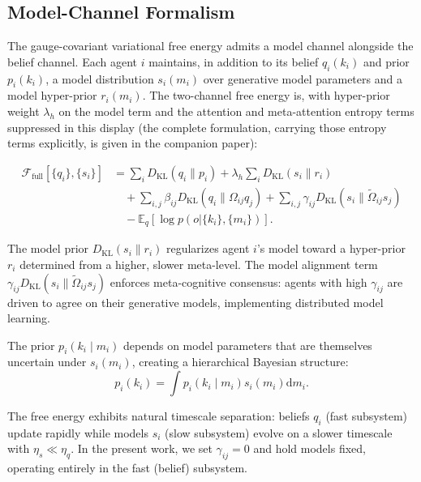 \documentclass[twoside,11pt]{article}
\begin{document}
\subsection{Model-Channel Formalism}
\label{app:model_channel_supp}

The gauge-covariant variational free energy admits a model channel alongside the belief channel. Each agent $i$ maintains, in addition to its belief $q_i(k_i)$ and prior $p_i(k_i)$, a model distribution $s_i(m_i)$ over generative model parameters and a model hyper-prior $r_i(m_i)$. The two-channel free energy is, with hyper-prior weight $\lambda_h$ on the model term and the attention and meta-attention entropy terms suppressed in this display (the complete formulation, carrying those entropy terms explicitly, is given in the companion paper):

\begin{equation}
\begin{aligned}
\mathcal{F}_{\text{full}}[\{q_i\},\{s_i\}]
&=\sum_i D_{\mathrm{KL}}(q_i \| p_i)
+\lambda_h\sum_i D_{\mathrm{KL}}(s_i \| r_i)\\
&\quad+\sum_{i,j}\beta_{ij} D_{\mathrm{KL}}(q_i \| \Omega_{ij}q_j)
+\sum_{i,j}\gamma_{ij} D_{\mathrm{KL}}(s_i \| \tilde{\Omega}_{ij}s_j)\\
&\quad-\mathbb{E}_q[\log p(o |\{k_i\},\{m_i\})].
\end{aligned}
\label{eq:free_energy_full_supp}
\end{equation}

The model prior $D_{\mathrm{KL}}(s_i \| r_i)$ regularizes agent $i$'s model toward a hyper-prior $r_i$ determined from a higher, slower meta-level. The model alignment term $\gamma_{ij} D_{\mathrm{KL}}(s_i \| \tilde{\Omega}_{ij} s_j)$ enforces meta-cognitive consensus: agents with high $\gamma_{ij}$ are driven to agree on their generative models, implementing distributed model learning.

The prior $p_i(k_i \mid m_i)$ depends on model parameters that are themselves uncertain under $s_i(m_i)$, creating a hierarchical Bayesian structure:
\begin{equation}
p_i(k_i) = \int p_i(k_i \mid m_i) s_i(m_i) \mathrm{d}m_i.
\end{equation}

The free energy exhibits natural timescale separation: beliefs $q_i$ (fast subsystem) update rapidly while models $s_i$ (slow subsystem) evolve on a slower timescale with $\eta_s \ll \eta_q$. In the present work, we set $\gamma_{ij} = 0$ and hold models fixed, operating entirely in the fast (belief) subsystem.
\end{document}
